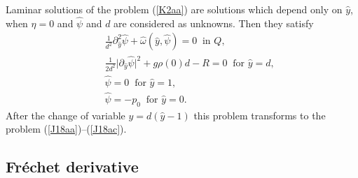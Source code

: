 \documentclass[a4paper,reqno,12pt]{amsart}
\theoremstyle{plain}
\theoremstyle{definition}
\numberwithin{equation}{section}
\begin{document}
Laminar solutions of the problem (\ref{K2aa}) are solutions which depend only on $\hat{y}$, when $\eta=0$ and $\hat{\psi}$ and $d$ are considered as unknowns. Then they satisfy
\begin{eqnarray}\label{K2aaa}
&&\frac{1}{d^2}\partial_{\hat{y}}^2
\hat{\psi}+\hat{\omega}(\hat{y},\hat{\psi})=0\;\;\mbox{in $Q$},\nonumber\\
&&\frac{1}{2d^2}\big|\partial_{\hat{y}}\hat{\psi}\big|^2+g\rho(0)d-R=0
\;\;\mbox{for $\hat{y}=d$},\nonumber\\
&&\hat{\psi}=0\;\;\mbox{for $\hat{y}=1$},\nonumber\\
&&\hat{\psi}=-p_0\;\;\mbox{for $\hat{y}=0$}.
\end{eqnarray}
After the change of variable $y=d(\hat{y}-1)$ this problem transforms to the problem
(\ref{J18aa})--(\ref{J18ac}).






\subsection{Fr\'{e}chet derivative}\label{SA15a}
\end{document}

